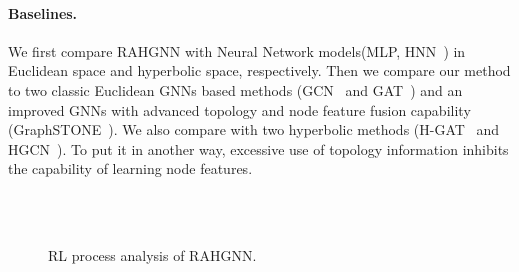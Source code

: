 \paragraph{Baselines.} 
We first compare RAHGNN with Neural Network models(MLP, HNN~\cite{HNN:GaneaBH18}) in Euclidean space and hyperbolic space, respectively. 
Then we compare our method to two classic Euclidean GNNs based methods (GCN~\cite{GCN} and GAT~\cite{GAT}) and an improved GNNs with advanced topology and node feature fusion capability (GraphSTONE~\cite{topic2020}). 
We also compare with two hyperbolic methods (H-GAT~\cite{HAtt} and HGCN~\cite{HGCN_ChamiYRL19}). 
To put it in another way, excessive use of topology information inhibits the capability of learning node features. 

\begin{figure}[htpb]
	\centering
	\\
	\\
	\caption{RL process analysis of RAHGNN.}
	\label{LP-C}
\end{figure}
\vspace{-0.6em}

